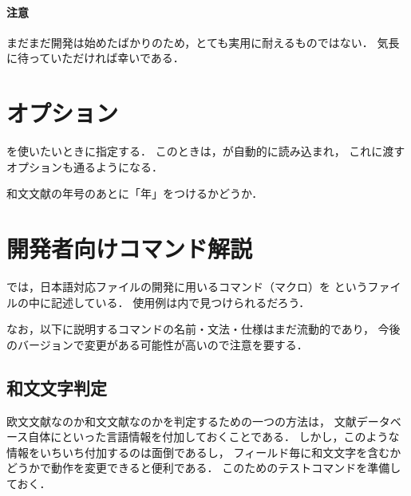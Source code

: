 \documentclass{jlreq}
\begin{document}
\paragraph{注意}
まだまだ開発は始めたばかりのため，とても実用に耐えるものではない．
気長に待っていただければ幸いである．

\section{オプション}

\begin{optionlist}
  を使いたいときに指定する．
  このときは，が自動的に読み込まれ，
  これに渡すオプションも通るようになる．

  和文文献の年号のあとに「年」をつけるかどうか．
\end{optionlist}

\section{開発者向けコマンド解説}
では，日本語対応ファイルの開発に用いるコマンド（マクロ）を
というファイルの中に記述している．
使用例は内で見つけられるだろう．

なお，以下に説明するコマンドの名前・文法・仕様はまだ流動的であり，
今後のバージョンで変更がある可能性が高いので注意を要する．

\subsection{和文文字判定}

欧文文献なのか和文文献なのかを判定するための一つの方法は，
文献データベース自体にといった言語情報を付加しておくことである．
しかし，このような情報をいちいち付加するのは面倒であるし，
フィールド毎に和文文字を含むかどうかで動作を変更できると便利である．
このためのテストコマンドを準備しておく．
\end{document}
